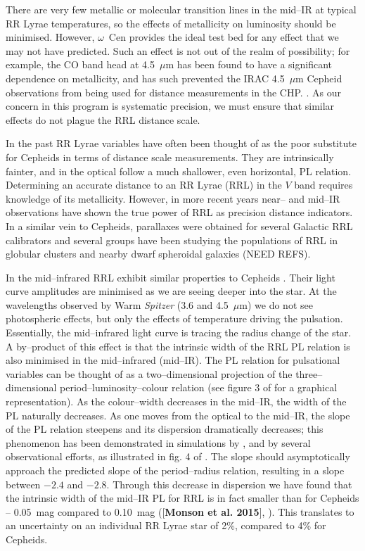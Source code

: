 \documentclass[a4paper,fleqn,usenatbib]{mnras}
\begin{document}
There are very few metallic or molecular transition lines in the mid--IR at typical RR Lyrae temperatures, so the effects of metallicity on luminosity should be minimised. However, $\omega$~Cen provides the ideal test bed for any effect that we may not have predicted. Such an effect is not out of the realm of possibility; for example, the CO band head at 4.5~$\mu$m has been found to have a significant dependence on metallicity, and has such prevented the IRAC 4.5~$\mu$m Cepheid observations from being used for distance measurements in the CHP. \citep{2011ApJ...743...76S, 2012ApJ...759..146M, 2015arXiv150206995S}. As our concern in this program is systematic precision, we must ensure that similar effects do not plague the RRL distance scale.  


In the past RR Lyrae variables have often been thought of as the poor substitute for Cepheids in terms of distance scale measurements. They are intrinsically fainter, and in the optical follow a much shallower, even horizontal, PL relation. Determining an accurate distance to an RR Lyrae (RRL) in the $V$ band requires knowledge of its metallicity. However, in more recent years near-- and mid--IR observations have shown the true power of RRL as precision distance indicators. In a similar vein to Cepheids,  parallaxes were obtained for several Galactic RRL calibrators \citet{2011AJ....142..187B} and several groups have been studying the populations of RRL in globular clusters and nearby dwarf spheroidal galaxies (NEED REFS). 


In the mid--infrared RRL exhibit similar properties to Cepheids \citep{2013ApJ...776..135M}. Their light curve amplitudes are minimised as we are seeing deeper into the star. At the wavelengths observed by Warm \textit{Spitzer} (3.6 and 4.5~$\mu$m) we do not see photospheric effects, but only the effects of temperature driving the pulsation. Essentially, the mid--infrared light curve is tracing the radius change of the star. A by--product of this effect is that the intrinsic width of the RRL PL relation is also minimised in the mid--infrared (mid--IR). The PL relation for pulsational variables can be thought of as a two--dimensional projection of the three--dimensional period--luminosity--colour relation (see figure 3 of \citet{1991PASP..103..933M} for a graphical representation). As the colour--width decreases in the mid--IR, the width of the PL naturally decreases. As one moves from the optical to the mid--IR, the slope of the PL relation steepens and its dispersion dramatically decreases; this phenomenon has been demonstrated in simulations by \citet{2004ApJS..154..633C}, and by several observational efforts, as illustrated in fig. 4 of \citet{2013ApJ...776..135M}. The slope should asymptotically approach the predicted slope of the period--radius relation, resulting in a slope between $-2.4$ and $-2.8$. Through this decrease in dispersion we have found that the intrinsic width of the mid--IR PL for RRL is in fact smaller than for Cepheids -- 0.05~mag compared to 0.10~mag ([{\bf Monson et al. 2015}], \citep{2015arXiv150507858N}). This translates to an uncertainty on an individual RR Lyrae star of 2\%, compared to 4\% for Cepheids. 
\end{document}
